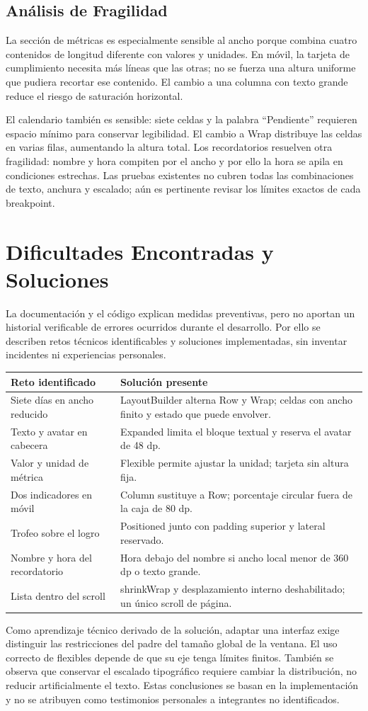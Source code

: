 \documentclass[12pt,a4paper]{article}
\begin{document}
\subsection{Análisis de Fragilidad}
La sección de métricas es especialmente sensible al ancho porque combina cuatro contenidos de longitud diferente con valores y unidades. En móvil, la tarjeta de cumplimiento necesita más líneas que las otras; no se fuerza una altura uniforme que pudiera recortar ese contenido. El cambio a una columna con texto grande reduce el riesgo de saturación horizontal.

El calendario también es sensible: siete celdas y la palabra ``Pendiente'' requieren espacio mínimo para conservar legibilidad. El cambio a Wrap distribuye las celdas en varias filas, aumentando la altura total. Los recordatorios resuelven otra fragilidad: nombre y hora compiten por el ancho y por ello la hora se apila en condiciones estrechas. Las pruebas existentes no cubren todas las combinaciones de texto, anchura y escalado; aún es pertinente revisar los límites exactos de cada breakpoint.
\section{Dificultades Encontradas y Soluciones}
La documentación y el código explican medidas preventivas, pero no aportan un historial verificable de errores ocurridos durante el desarrollo. Por ello se describen retos técnicos identificables y soluciones implementadas, sin inventar incidentes ni experiencias personales.
\begin{longtable}{p{4.2cm}p{9.3cm}}
\textbf{Reto identificado} & \textbf{Solución presente}\\\hline
Siete días en ancho reducido & LayoutBuilder alterna Row y Wrap; celdas con ancho finito y estado que puede envolver.\\
Texto y avatar en cabecera & Expanded limita el bloque textual y reserva el avatar de 48 dp.\\
Valor y unidad de métrica & Flexible permite ajustar la unidad; tarjeta sin altura fija.\\
Dos indicadores en móvil & Column sustituye a Row; porcentaje circular fuera de la caja de 80 dp.\\
Trofeo sobre el logro & Positioned junto con padding superior y lateral reservado.\\
Nombre y hora del recordatorio & Hora debajo del nombre si ancho local menor de 360 dp o texto grande.\\
Lista dentro del scroll & shrinkWrap y desplazamiento interno deshabilitado; un único scroll de página.\\\hline
\end{longtable}
Como aprendizaje técnico derivado de la solución, adaptar una interfaz exige distinguir las restricciones del padre del tamaño global de la ventana. El uso correcto de flexibles depende de que su eje tenga límites finitos. También se observa que conservar el escalado tipográfico requiere cambiar la distribución, no reducir artificialmente el texto. Estas conclusiones se basan en la implementación y no se atribuyen como testimonios personales a integrantes no identificados.
\end{document}
